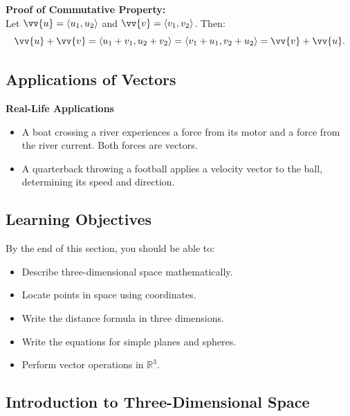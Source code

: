 \documentclass{article}
\begin{document}
\begin{proofbox}
    \textbf{Proof of Commutative Property:} \\
    Let \(\vv{u} = \langle u_1, u_2 \rangle\) and \(\vv{v} = \langle v_1, v_2 \rangle\). Then:
    \[
    \vv{u} + \vv{v} = \langle u_1 + v_1, u_2 + v_2 \rangle = \langle v_1 + u_1, v_2 + u_2 \rangle = \vv{v} + \vv{u}.
    \]
\end{proofbox}

\subsection*{Applications of Vectors}

\begin{examplebox}
    \textbf{Real-Life Applications}
    \begin{itemize}
        \item A boat crossing a river experiences a force from its motor and a force from the river current. Both forces are vectors.
        \item A quarterback throwing a football applies a velocity vector to the ball, determining its speed and direction.
    \end{itemize}
\end{examplebox}

\subsection*{Learning Objectives}

By the end of this section, you should be able to:
\begin{itemize}
    \item Describe three-dimensional space mathematically.
    \item Locate points in space using coordinates.
    \item Write the distance formula in three dimensions.
    \item Write the equations for simple planes and spheres.
    \item Perform vector operations in \(\mathbb{R}^3\).
\end{itemize}

\subsection*{Introduction to Three-Dimensional Space}
\end{document}
